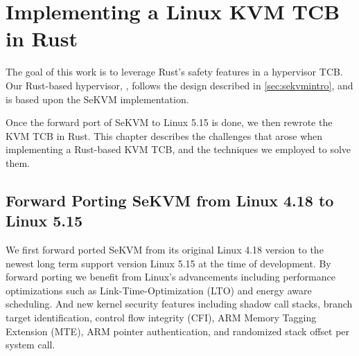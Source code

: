 \chapter{Implementing a Linux KVM TCB in Rust}
\label{sec:rewrite}


The goal of this work is to leverage Rust's safety features in a hypervisor TCB.
Our Rust-based hypervisor, \rustsec{}, follows the design described in
\autoref{sec:sekvmintro}, and is based upon the SeKVM implementation.


Once the forward port of SeKVM to Linux 5.15 is done, we then rewrote
the KVM TCB in Rust.
This chapter describes the challenges that arose when implementing a
Rust-based KVM TCB, and the techniques we employed to solve them.

\section{Forward Porting SeKVM from Linux 4.18 to Linux 5.15}
We first forward ported SeKVM from its original Linux 4.18 version to the
newest long term support version Linux 5.15 at the time of development.
By forward porting we benefit from Linux's advancements including performance
optimizations such as Link-Time-Optimization (LTO) and energy aware scheduling.
And new kernel security features including  shadow call stacks,
branch target identification, control flow integrity (CFI), ARM Memory Tagging
Extension (MTE), ARM pointer authentication, and randomized stack offset per
system call.

